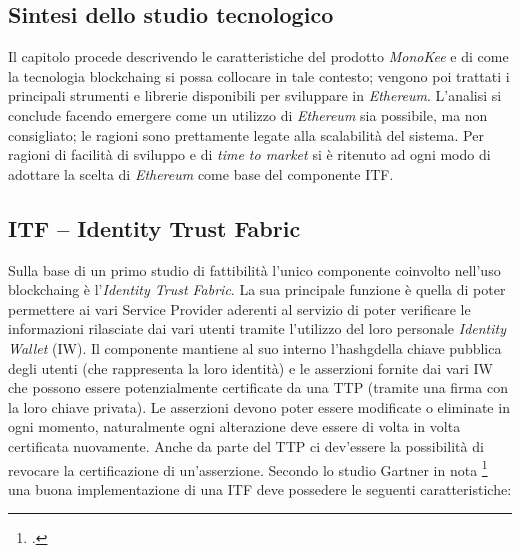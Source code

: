 \subsection{Sintesi dello studio tecnologico}
Il capitolo procede descrivendo le caratteristiche del prodotto \textit{MonoKee} e di come la tecnologia \gls{blockchaing} si possa collocare in tale contesto; vengono poi trattati i principali strumenti e librerie disponibili per sviluppare in \textit{Ethereum}. L’analisi si conclude facendo emergere come un utilizzo di \textit{Ethereum} sia possibile, ma non consigliato; le ragioni sono prettamente legate alla scalabilità del sistema. Per ragioni di facilità di sviluppo e di \textit{time to market} si è ritenuto ad ogni modo di adottare la scelta di \textit{Ethereum} come base del componente ITF.

\subsection{ITF – Identity Trust Fabric}
Sulla base di un primo studio di fattibilità l’unico componente coinvolto nell’uso \gls{blockchaing} è l’\textit{Identity Trust Fabric}. La sua principale funzione è quella di poter permettere ai vari Service Provider aderenti al servizio di poter verificare le informazioni rilasciate dai vari utenti tramite l’utilizzo del loro personale \textit{Identity Wallet} (IW). Il componente mantiene al suo interno l’\gls{hashg}\glsfirstoccur della chiave pubblica degli utenti (che rappresenta la loro identità) e le asserzioni fornite dai vari IW che possono essere potenzialmente certificate da una TTP (tramite una firma con la loro chiave privata). Le asserzioni devono poter essere modificate o eliminate in ogni momento, naturalmente ogni alterazione deve essere di volta in volta certificata nuovamente. Anche da parte del TTP ci dev’essere la possibilità di revocare la certificazione di un’asserzione. 
Secondo lo studio Gartner in nota \footcite{farah:The-Dawn-of-Decentralized-Identity} una buona implementazione di una ITF deve possedere le seguenti caratteristiche:
